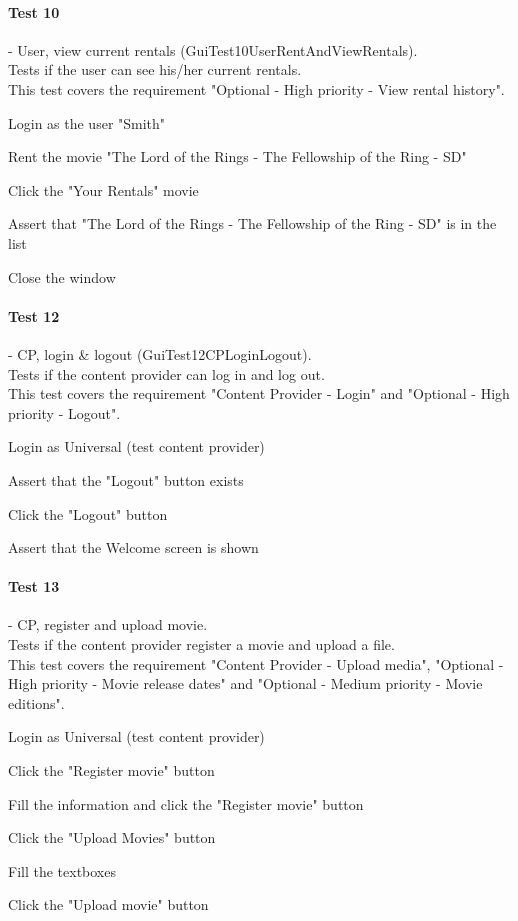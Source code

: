 \paragraph{Test 10} - User, view current rentals (GuiTest10UserRentAndViewRentals). \\
Tests if the user can see his/her current rentals. \\
This test covers the requirement "Optional - High priority - View rental history".
\begin{my_enumerate}
\item Login as the user "Smith"
\item Rent the movie "The Lord of the Rings - The Fellowship of the Ring - SD"
\item Click the "Your Rentals" movie
\item Assert that "The Lord of the Rings - The Fellowship of the Ring - SD" is in the list
\item Close the window
\end{my_enumerate}

\paragraph{Test 12} - CP, login \& logout (GuiTest12CPLoginLogout). \\
Tests if the content provider can log in and log out. \\
This test covers the requirement "Content Provider - Login" and "Optional - High priority - Logout".
\begin{my_enumerate}
\item Login as Universal (test content provider)
\item Assert that the "Logout" button exists
\item Click the "Logout" button
\item Assert that the Welcome screen is shown
\end{my_enumerate}

\paragraph{Test 13} - CP, register and upload movie. \\
Tests if the content provider register a movie and upload a file. \\
This test covers the requirement "Content Provider - Upload media", "Optional - High priority - Movie release dates" and "Optional - Medium priority - Movie editions".
\begin{my_enumerate}
\item Login as Universal (test content provider)
\item Click the "Register movie" button
\item Fill the information and click the "Register movie" button
\item Click the "Upload Movies" button
\item Fill the textboxes
\item Click the "Upload movie" button
\end{my_enumerate}

